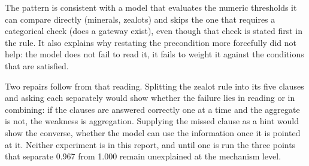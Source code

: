 \documentclass[journal]{IEEEtran}
\begin{document}
The pattern is consistent with a model that evaluates the numeric thresholds it can compare
directly (minerals, zealots) and skips the one that requires a categorical check (does a
gateway exist), even though that check is stated first in the rule. It also explains why
restating the precondition more forcefully did not help: the model does not fail to read it,
it fails to weight it against the conditions that are satisfied.

Two repairs follow from that reading. Splitting the zealot rule into its five clauses and asking
each separately would show whether the failure lies in reading or in combining: if the clauses
are answered correctly one at a time and the aggregate is not, the weakness is aggregation.
Supplying the missed clause as a hint would show the converse, whether the model can use the
information once it is pointed at it. Neither experiment is in this report, and until one is run
the three points that separate 0.967 from 1.000 remain unexplained at the mechanism level.
\end{document}
